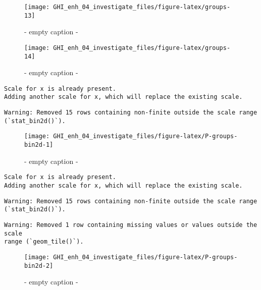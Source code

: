 \documentclass[
  10pt,
  a4paper,oneside]{article}
\begin{document}
\begin{figure}[H]

{\centering \texttt{[image: GHI\_enh\_04\_investigate\_files/figure-latex/groups-13]} 

}

\caption{ - empty caption - }\label{fig:groups-13}
\end{figure}
\begin{figure}[H]

{\centering \texttt{[image: GHI\_enh\_04\_investigate\_files/figure-latex/groups-14]} 

}

\caption{ - empty caption - }\label{fig:groups-14}
\end{figure}

\begin{verbatim}
Scale for x is already present.
Adding another scale for x, which will replace the existing scale.
\end{verbatim}

\begin{verbatim}
Warning: Removed 15 rows containing non-finite outside the scale range
(`stat_bin2d()`).
\end{verbatim}

\begin{figure}[H]

{\centering \texttt{[image: GHI\_enh\_04\_investigate\_files/figure-latex/P-groups-bin2d-1]} 

}

\caption{ - empty caption - }\label{fig:P-groups-bin2d-1}
\end{figure}

\begin{verbatim}
Scale for x is already present.
Adding another scale for x, which will replace the existing scale.
\end{verbatim}

\begin{verbatim}
Warning: Removed 15 rows containing non-finite outside the scale range
(`stat_bin2d()`).
\end{verbatim}

\begin{verbatim}
Warning: Removed 1 row containing missing values or values outside the scale
range (`geom_tile()`).
\end{verbatim}

\begin{figure}[H]

{\centering \texttt{[image: GHI\_enh\_04\_investigate\_files/figure-latex/P-groups-bin2d-2]} 

}

\caption{ - empty caption - }\label{fig:P-groups-bin2d-2}
\end{figure}
\end{document}
